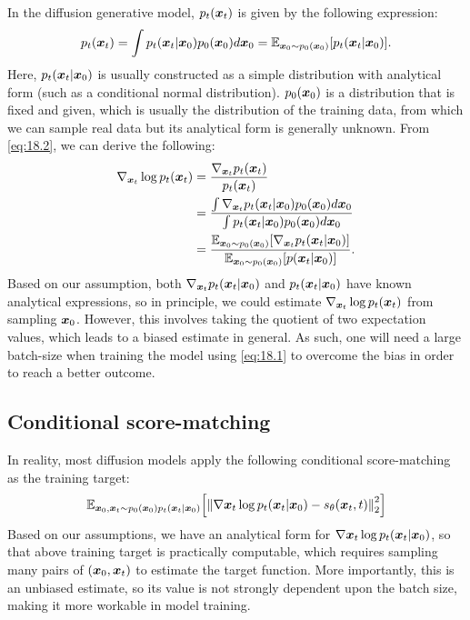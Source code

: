 In the diffusion generative model, $p_t(\bm{x}_{t})$ is given by the following expression:
\begin{equation}
    \label{eq:18.2}
    p_t(\bm{x}_{t})=\int p_t(\bm{x}_{t}|\bm{x}_0)p_0(\bm{x}_0)d\bm{x}_0=\mathbb{E}_{\bm{x}_0\sim p_0(\bm{x}_0)} [p_t(\bm{x}_{t}|\bm{x}_0)].
\end{equation}
Here, $p_t(\bm{x}_{t}|\bm{x}_0)$ is usually constructed as a simple distribution with analytical form (such as a conditional normal distribution). $p_0(\bm{x}_0)$ is a distribution that is fixed and given, which is usually the distribution of the training data, from which we can sample real data but its analytical form is generally unknown. From \cref{eq:18.2}, we can derive the following:
\begin{align}
    \nabla_{\bm{x}_{t}}\log p_t(\bm{x}_{t}) &=\frac{\nabla_{\bm{x}_{t}}p_t(\bm{x}_{t})}{p_t(\bm{x}_{t})}\nonumber\\
    &=\frac{\int \nabla_{\bm{x}_{t}} p_t(\bm{x}_{t}|\bm{x}_0)p_0(\bm{x}_0)d\bm{x}_0}{\int p_t(\bm{x}_{t}|\bm{x}_0)p_0(\bm{x}_0)d\bm{x}_0}\label{eq:18.3}\\
    &=\frac{\mathbb{E}_{\bm{x}_0\sim p_0(\bm{x}_0)} [\nabla_{\bm{x}_{t}} p_t(\bm{x}_{t}|\bm{x}_0)]}{\mathbb{E}_{\bm{x}_0\sim p_0(\bm{x}_0)} [p(\bm{x}_{t}|\bm{x}_0)]}.\nonumber
\end{align}
Based on our assumption, both $\nabla_{\bm{x}_{t}}p_t(\bm{x}_{t}|\bm{x}_0)$ and $p_t(\bm{x}_{t}|\bm{x}_0)$ have known analytical expressions, so in principle, we could estimate  $\nabla_{\bm{x}_{t}}\log p_t(\bm{x}_{t})$ from sampling $\bm{x}_0$. However, this involves taking the quotient of two expectation values, which leads to a biased estimate in general. As such, one will need a large batch-size when training the model using \cref{eq:18.1} to overcome the bias in order to reach a better outcome.

\subsection{Conditional score-matching}

In reality, most diffusion models apply the following conditional score-matching as the training target:
\begin{equation}
    \label{eq:18.4}
    \mathbb{E}_{\bm{x}_0,\bm{x}_{t}\sim p_0(\bm{x}_0)p_t(\bm{x}_{t}|\bm{x}_0)}\Bigl[ \left\|\nabla{\bm{x}_{t}}\log p_t(\bm{x}_{t}|\bm{x}_0)-s_\theta (\bm{x}_{t},t) \right\|_2^2\Bigr]
\end{equation}
Based on our assumptions, we have an analytical form for $\nabla{\bm{x}_{t}}\log p_t(\bm{x}_{t}|\bm{x}_0)$, so that above training target is practically computable, which requires sampling many pairs of $(\bm{x}_0,\bm{x}_{t})$ to estimate the target function. More importantly, this is an unbiased estimate, so its value is not strongly dependent upon the batch size, making it more workable in model training.

